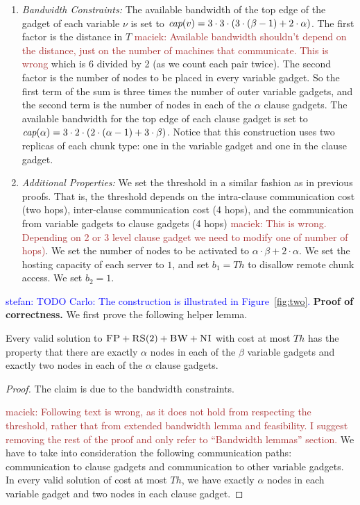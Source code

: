 \documentclass[9pt]{sigcomm-alternate}
\newcommand{\maciek}[1]{\textcolor{brown}{maciek: #1}}
\newcommand{\stefan}[1]{\textcolor{blue}{stefan: #1}}
\newcommand{\variab}{\nu}
\newcommand{\clauses}{\alpha}
\newcommand{\vars}{\beta}
\newcommand{\capa}{\emph{cap}}
\newcommand{\CC}{\textsc{NI}}
\newcommand{\FP}{\textsc{FP}}
\newcommand{\RS}{\textsc{RS}}
\newcommand{\BW}{\textsc{BW}}
\newcommand{\Tree}{\ensuremath{T}}
\newcommand{\CostTrans}{\ensuremath{b_1}}
\newcommand{\CostCom}{\ensuremath{b_2}}
\newcommand{\Thr}{\ensuremath{Th}}
\begin{document}
\begin{appendix}
\begin{enumerate}
  \item \emph{Bandwidth Constraints:}
    The available bandwidth of the top edge of the gadget of each variable $\variab$ is set to
$\capa(v) = 3  \cdot  3  \cdot  (3  \cdot  (\vars - 1) + 2  \cdot  \clauses)$.
The first factor is the distance in $\Tree$ \maciek{Available bandwidth shouldn't depend on the distance, just on the number of machines that communicate. This is wrong}  which is 6 divided by 2 (as
we count each pair twice). The second factor is
the number of nodes to be placed in every variable gadget.
So the first term of the
sum is three times the number of outer variable gadgets,
and the second term is the
number of nodes in each of the $\clauses$ clause gadgets.
The available bandwidth for the top edge of each clause gadget is set to
$\capa(\clauses) = 3  \cdot  2  \cdot  (2  \cdot  (\clauses - 1) + 3  \cdot  \vars) $.
Notice that this construction uses two replicas of each chunk type:
one in the variable gadget and one in the clause gadget.

  \item \emph{Additional Properties:} We set the threshold in a
    similar fashion as in previous proofs. That is,
the threshold depends on the intra-clause communication cost (two hops),
inter-clause communication cost (4 hops),
  and the communication from variable gadgets to clause gadgets (4 hops) \maciek{This is wrong. Depending on 2 or 3 level clause gadget we need to modify one of number of hops)}. We
  set the number of nodes to be activated to $\clauses \cdot \vars + 2 \cdot
  \clauses$. We set the hosting capacity of each server to $1$, and set
  $\CostTrans = \Thr$ to disallow remote chunk access. We set $\CostCom = 1$.


 \end{enumerate}

\stefan{TODO Carlo: The construction is illustrated in Figure~\ref{fig:two}.}
\textbf{Proof of correctness.}
We first prove the following helper lemma.
\begin{lemma}
Every valid solution to $\FP+\RS(2)+\BW+\CC$
with cost at most $\Thr$ has the property that
there are exactly $\clauses$ nodes in each of the $\vars$ variable gadgets
and exactly two nodes in each of the $\clauses$ clause gadgets.
\end{lemma}
\begin{proof}
The claim is due to the bandwidth constraints.

\maciek{Following text is wrong, as it does not hold from respecting the threshold, rather that from extended bandwidth lemma and feasibility. I suggest removing the rest of the proof and only refer to ``Bandwidth lemmas'' section.}
We have to take into
consideration the following communication paths:
communication to clause gadgets and
communication to
other variable gadgets.
In every valid solution of cost at most $\Thr$, we have exactly
$\clauses$ nodes in each variable gadget and two nodes in each clause gadget.
\end{proof}



\end{appendix}
\end{document}
